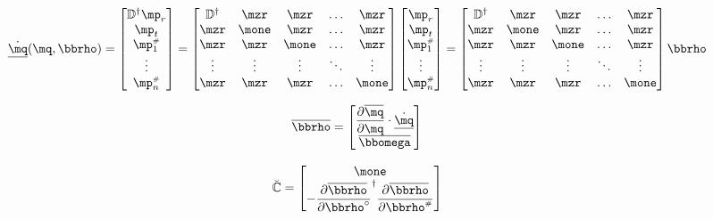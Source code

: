 \documentclass[a4paper,11pt,brazil,fleqn]{article}
\begin{document}
\begin{equation} \label{eq:dq}
\underline{\dot{\mq}}(\mq,\mrho) = \begin{bmatrix}
\mD^\msP \mp_r \\
\mp_t \\
\mp\ssh_1 \\
\vdots \\
\mp\ssh_n \\
\end{bmatrix}
=
\begin{bmatrix}
\mD^\msP  & \mzr & \mzr & \ldots & \mzr\\
\mzr & \mone & \mzr & \ldots & \mzr\\
\mzr & \mzr & \mone & \ldots & \mzr\\
\vdots & \vdots & \vdots &  \ddots & \vdots\\
\mzr  & \mzr & \mzr &\ldots & \mone
\end{bmatrix}
\begin{bmatrix}
\mp_r \\
\mp_t \\
\mp\ssh_1 \\
\vdots \\
\mp\ssh_n \\
\end{bmatrix}
=
\begin{bmatrix}
\mD^\msP  & \mzr & \mzr & \ldots & \mzr\\
\mzr & \mone & \mzr & \ldots & \mzr\\
\mzr & \mzr & \mone & \ldots & \mzr\\
\vdots & \vdots & \vdots &  \ddots & \vdots\\
\mzr  & \mzr & \mzr &\ldots & \mone
\end{bmatrix}
\mrho
\end{equation}

\begin{equation} \label{eq:VinculosVelocidades}
\overline{\mrho} = \begin{bmatrix}
\displaystyle\frac{\partial \overline{\mq}}{\partial \mq} \cdot \underline{\dot{\mq}} \\
\overline{\momega}
\end{bmatrix}
\end{equation}

\begin{equation} \label{eq:MatrizCchapeu}
\breve{\mC} = \begin{bmatrix}
\mone \\
- \displaystyle\frac{\partial \overline{\mrho}}{\partial \mrho\cir}^\msP \frac{\partial \overline{\mrho}}{\partial \mrho\ssh }
\end{bmatrix}
\end{equation}
\end{document}
